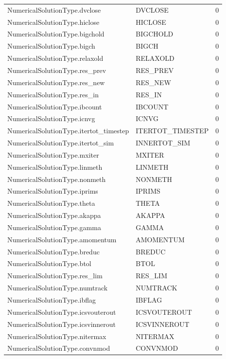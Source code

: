 \begin{longtable}{p{6cm} p{4cm} p{2cm} }
NumericalSolutionType.dvclose &  DVCLOSE & 0 \\ 
NumericalSolutionType.hiclose &  HICLOSE & 0 \\ 
NumericalSolutionType.bigchold &  BIGCHOLD & 0 \\ 
NumericalSolutionType.bigch &  BIGCH & 0 \\ 
NumericalSolutionType.relaxold &  RELAXOLD & 0 \\ 
NumericalSolutionType.res\_prev &  RES\_PREV & 0 \\ 
NumericalSolutionType.res\_new &  RES\_NEW & 0 \\ 
NumericalSolutionType.res\_in &  RES\_IN & 0 \\ 
NumericalSolutionType.ibcount &  IBCOUNT & 0 \\ 
NumericalSolutionType.icnvg &  ICNVG & 0 \\ 
NumericalSolutionType.itertot\_timestep &  ITERTOT\_TIMESTEP & 0 \\ 
NumericalSolutionType.itertot\_sim &  INNERTOT\_SIM & 0 \\ 
NumericalSolutionType.mxiter &  MXITER & 0 \\ 
NumericalSolutionType.linmeth &  LINMETH & 0 \\ 
NumericalSolutionType.nonmeth &  NONMETH & 0 \\ 
NumericalSolutionType.iprims &  IPRIMS & 0 \\ 
NumericalSolutionType.theta &  THETA & 0 \\ 
NumericalSolutionType.akappa &  AKAPPA & 0 \\ 
NumericalSolutionType.gamma &  GAMMA & 0 \\ 
NumericalSolutionType.amomentum &  AMOMENTUM & 0 \\ 
NumericalSolutionType.breduc &  BREDUC & 0 \\ 
NumericalSolutionType.btol &  BTOL & 0 \\ 
NumericalSolutionType.res\_lim &  RES\_LIM & 0 \\ 
NumericalSolutionType.numtrack &  NUMTRACK & 0 \\ 
NumericalSolutionType.ibflag &  IBFLAG & 0 \\ 
NumericalSolutionType.icsvouterout &  ICSVOUTEROUT & 0 \\ 
NumericalSolutionType.icsvinnerout &  ICSVINNEROUT & 0 \\ 
NumericalSolutionType.nitermax &  NITERMAX & 0 \\ 
NumericalSolutionType.convnmod &  CONVNMOD & 0 \\ 

\end{longtable}
